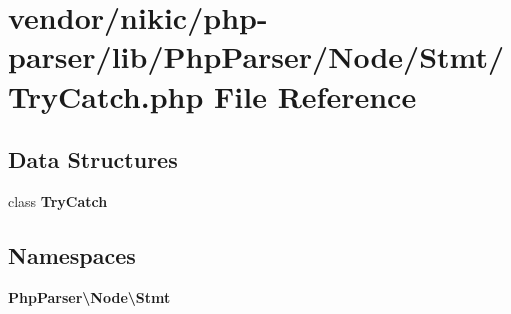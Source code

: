 \section{vendor/nikic/php-\/parser/lib/\+Php\+Parser/\+Node/\+Stmt/\+Try\+Catch.php File Reference}
\label{_try_catch_8php}
\subsection*{Data Structures}
\begin{DoxyCompactItemize}
\item 
class {\bf Try\+Catch}
\end{DoxyCompactItemize}
\subsection*{Namespaces}
\begin{DoxyCompactItemize}
\item 
 {\bf Php\+Parser\textbackslash{}\+Node\textbackslash{}\+Stmt}
\end{DoxyCompactItemize}
